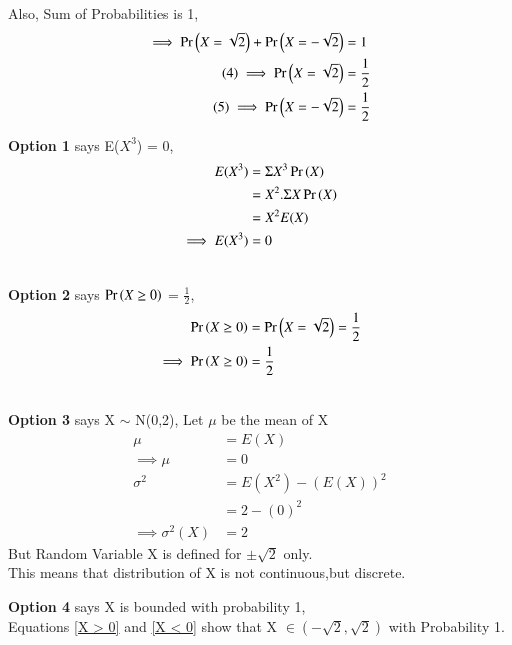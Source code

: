 \documentclass[journal,12pt,twocolumn]{IEEEtran}
\begin{document}
Also, Sum of Probabilities is 1,
\begin{align*}
    \implies \Pr\left(X = \sqrt{2}\right) + \Pr\left(X =-\sqrt{2}\right) &= 1 \\
    \tag{4} \label{X > 0}
    \implies                     \Pr\left(X = \sqrt{2}\right) &= \frac{1}{2} \\
    \tag{5} \label{X < 0}
    \implies                    \Pr\left(X = -\sqrt{2}\right) &= \frac{1}{2}
\end{align*}

\textbf{Option 1} says E($X^3$) = 0,
\begin{align*}
    E(X^3) &= \Sigma X^3 \Pr\left(X\right) \\
           &= X^2 .\Sigma X \Pr\left(X\right) \\
           &= X^2 E(X)\\
\implies E(X^3) &= 0      
\end{align*} 
\begin{center}
\end{center}
\vspace{0.8cm} \\
\textbf{Option 2} says $\Pr\left(X \ge 0\right)$ = $\frac{1}{2}$,
\begin{align*}
    \Pr\left(X\ge 0\right) &= \Pr\left(X = \sqrt{2}\right) = \frac{1}{2} \\
    \implies \Pr\left(X \ge 0\right) &= \frac{1}{2}
\end{align*}
\begin{center}
\end{center}
\vspace{0.1cm} \\
\textbf{Option 3} says X $\sim$ N(0,2),
Let $\mu$ be the mean of X
\begin{align*}
            \mu &= E(X) \\
    \tag{6} \label{mu}
   \implies \mu &= 0 \\
      \sigma^2 &= E(X^2) - (E(X))^{2} \\
                &= 2 - (0)^{2} \\
                \tag{7} 
\implies \sigma^2(X) &= 2
\end{align*}
But Random Variable X is defined for $\pm\sqrt{2}$ only.\\
This means that distribution of X is not continuous,but discrete.
\vspace{0.3cm}
\begin{center}
\end{center}
\vspace{0.3cm}
\textbf{Option 4} says X is bounded with probability 1, \\
Equations \eqref{X > 0} and \eqref{X < 0} show that X $\in ({-\sqrt{2},\sqrt{2}})$ with Probability 1. 
\vspace{0.5cm} \\
\centering {}
\vspace{0.5cm}\\
\end{document}
